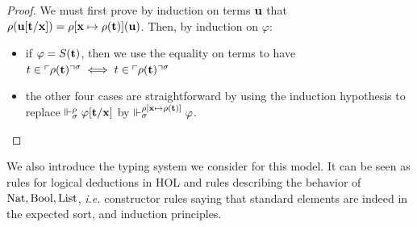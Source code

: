 \documentclass[a4paper,UKenglish,cleveref, autoref, thm-restate]{lipics-v2021}
\begin{document}
\begin{proof}
 We must first prove by induction on terms $\mathbf{u}$ that $\rho(\mathbf{u}[\mathbf{t}/\mathbf{x}]) = \rho[\mathbf{x} \mapsto \rho(\mathbf{t})](\mathbf{u})$. Then, by induction on $\varphi$:
 \begin{itemize}
 \item if $\varphi = S(\mathbf{t})$, then we use the equality on terms to have $t \in \ulcorner\rho(\mathbf{t})\urcorner^{\sigma} \iff t \in \ulcorner\rho(\mathbf{t})\urcorner^{\sigma}$
 \item the other four cases are straightforward by using the induction hypothesis to replace $\Vdash_{\sigma}^{\rho} \varphi[\mathbf{t}/\mathbf{x}]$ by $\Vdash_{\sigma}^{\rho[\mathbf{x}\mapsto\rho(\mathbf{t})]} \varphi$.\qedhere
 \end{itemize}
\end{proof}

We also introduce the typing system we consider for this model. It can be seen as rules for logical deductions in HOL and rules describing the behavior of $\mathrm{Nat},\mathrm{Bool},\mathrm{List}$, \textit{i.e.} constructor rules saying that standard elements are indeed in the expected sort, and induction principles.
\end{document}
